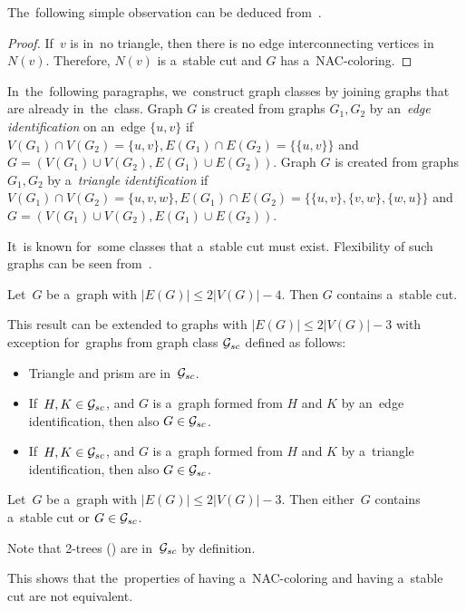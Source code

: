 The~following simple observation can be deduced
from~.
%
%
\begin{proof}
	If~\( v \) is in~no triangle, then there is no edge interconnecting
	vertices in~\( N(v) \). Therefore, \( N(v) \) is a~stable cut and \( G \)
	has a~NAC-coloring.
\end{proof}

In~the~following paragraphs, we~construct graph classes by joining graphs
that are already in~the~class.
Graph \( G \) is created from graphs \( G_1, G_2 \) by an~\emph{edge identification}
on an~edge \( \{u, v\} \)
if~\( V(G_1) \cap V(G_2) = \{u, v\}, E(G_1) \cap E(G_2) = \{\{u, v\}\} \)
and \( G = (V(G_1) \cup V(G_2), E(G_1) \cup E(G_2)) \).
Graph \( G \) is created from graphs \( G_1, G_2 \) by a~\emph{triangle identification}
if~\( V(G_1) \cap V(G_2) = \{u, v, w\}, E(G_1) \cap E(G_2) = \{\{u, v\}, \{v, w\}, \{w, u\}\} \)
and \( G = (V(G_1) \cup V(G_2), E(G_1) \cup E(G_2)) \).

It~is known for~some classes that a~stable cut must exist.
Flexibility of such graphs can be seen from~.
%
\begin{theorem}
	Let~\( G \) be a~graph with \( |E(G)| \le 2|V(G)|-4 \).
	Then \( G \) contains a~stable cut.
\end{theorem}
%
This result can be extended to graphs with \( |E(G)| \le 2|V(G)|-3 \) with exception
for~graphs from graph class \( \mathcal{G}_{sc} \) defined as follows:
%
\begin{itemize}
	\item Triangle and prism are in~\( \mathcal{G}_{sc} \).
	\item If~\( H, K \in \mathcal{G}_{sc} \), and \( G \) is a~graph
	      formed from \( H \) and \( K \) by an~edge identification,
	      then also \( G \in \mathcal{G}_{sc} \).
	\item If~\( H, K \in \mathcal{G}_{sc} \), and \( G \) is a~graph
	      formed from \( H \) and \( K \) by a~triangle identification,
	      then also \( G \in \mathcal{G}_{sc} \).
\end{itemize}
%
%
\begin{theorem}
	Let~\( G \) be a~graph with \( |E(G)| \le 2|V(G)|-3 \).
	Then either~\( G \) contains a~stable cut or \( G \in \mathcal{G}_{sc} \).
\end{theorem}
%
Note that 2-trees ()
are in~\( \mathcal{G}_{sc} \) by definition.
%
%
This shows that the~properties of having a~NAC-coloring and having a~stable cut
are not equivalent.

